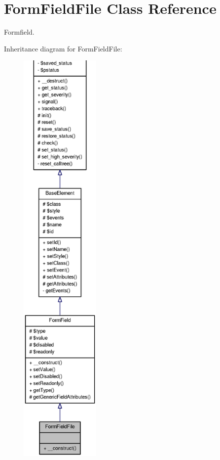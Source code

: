 \section{FormFieldFile Class Reference}
\label{classFormFieldFile}


Formfield.  




Inheritance diagram for FormFieldFile:\nopagebreak
\begin{figure}[H]
\begin{center}
\leavevmode
\includegraphics[height=600pt]{classFormFieldFile__inherit__graph}
\end{center}
\end{figure}


